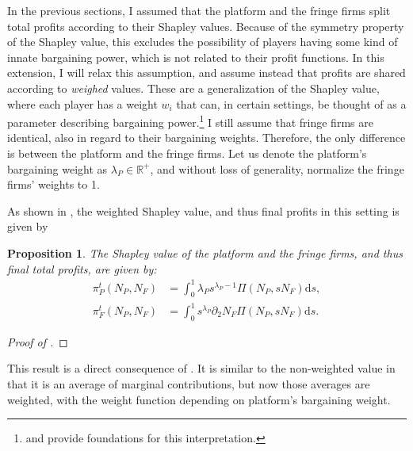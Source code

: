 \documentclass[a4paper]{article}
\newtheorem{proposition}{Proposition}
\newcommand{\ds}{\mathrm{d}s}
\begin{document}
In the previous sections, I assumed that the platform and the fringe firms split total profits according to their Shapley values.
Because of the symmetry property of the Shapley value, this excludes the possibility of players having some kind of innate bargaining power, which is not related to their profit functions.
In this extension, I will relax this assumption, and assume instead that profits are shared according to \emph{weighed} values.
These are a generalization of the Shapley value, where each player has a weight $w_i$ that can, in certain settings, be thought of as a parameter describing bargaining power.\footnote{
    \textcite{hart1996bargaining} and \textcite{stole1996intra} provide foundations for this interpretation.
}
I still assume that fringe firms are identical, also in regard to their bargaining weights.
Therefore, the only difference is between the platform and the fringe firms.
Let us denote the platform's bargaining weight as $\lambda_P \in \mathbb{R}^+$, and without loss of generality, normalize the fringe firms' weights to 1.

As shown in , the weighted Shapley value, and thus final profits in this setting is given by
\begin{proposition}
    \label{prop:weighted_shapley_value}
    The Shapley value of the platform and the fringe firms, and thus final total profits, are given by:
    \begin{align*}
        \pi^t_P(N_P, N_F) &= \int_0^1 \lambda_P s ^ {\lambda_P - 1} \Pi(N_P,s N_F) \ds, \\
        \pi^t_F(N_P, N_F) &= \int_0^1 s ^ {\lambda_P} \partial_2 N_F \Pi(N_P,s N_F) \ds.
    \end{align*}
\end{proposition}
\begin{proof}[Proof of ]
\end{proof}
This result is a direct consequence of .
It is similar to the non-weighted value in that it is an average of marginal contributions, but now those averages are weighted, with the weight function depending on platform's bargaining weight.
\end{document}

